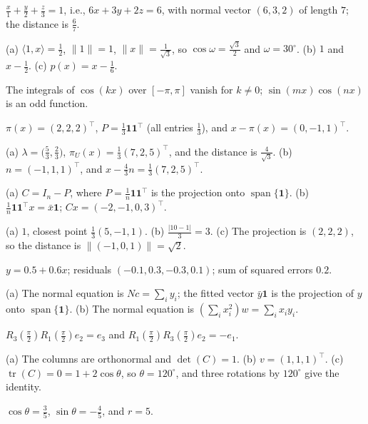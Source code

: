 \documentclass[11pt]{article}
\theoremstyle{definition}
\newcommand{\norm}[1]{\lVert #1 \rVert}
\newcommand{\ip}[2]{\langle #1, #2 \rangle}
\DeclareMathOperator{\Span}{span}
\DeclareMathOperator{\tr}{tr}
\begin{document}
\begin{description}[leftmargin=0pt, itemsep=0.3em]
    \item[\ref{pr:hyperplane-form}.] $\frac{x}{1} + \frac{y}{2} + \frac{z}{3} = 1$, i.e., $6x + 3y + 2z = 6$, with normal vector $(6, 3, 2)$ of length $7$; the distance is $\frac{6}{7}$.
    \item[\ref{pr:func-ip}.] (a) $\ip{1}{x} = \frac{1}{2}$, $\norm{1} = 1$, $\norm{x} = \frac{1}{\sqrt{3}}$, so $\cos\omega = \frac{\sqrt{3}}{2}$ and $\omega = 30^\circ$. (b) $1$ and $x - \frac{1}{2}$. (c) $p(x) = x - \frac{1}{6}$.
    \item[\ref{pr:fourier}.] The integrals of $\cos(kx)$ over $[-\pi, \pi]$ vanish for $k \neq 0$; $\sin(mx)\cos(nx)$ is an odd function.
    \item[\ref{pr:proj-line}.] $\pi(x) = (2, 2, 2)^\top$, $P = \frac{1}{3}\mathbf{1}\mathbf{1}^\top$ (all entries $\frac{1}{3}$), and $x - \pi(x) = (0, -1, 1)^\top$.
    \item[\ref{pr:proj-plane}.] (a) $\lambda = \big(\frac{5}{3}, \frac{2}{3}\big)$, $\pi_U(x) = \frac{1}{3}(7, 2, 5)^\top$, and the distance is $\frac{4}{\sqrt{3}}$. (b) $n = (-1, 1, 1)^\top$, and $x - \frac{4}{3} n = \frac{1}{3}(7, 2, 5)^\top$.
    \item[\ref{pr:centering}.] (a) $C = I_n - P$, where $P = \frac{1}{n}\mathbf{1}\mathbf{1}^\top$ is the projection onto $\Span\{\mathbf{1}\}$. (b) $\frac{1}{n}\mathbf{1}\mathbf{1}^\top x = \bar{x}\mathbf{1}$; $Cx = (-2, -1, 0, 3)^\top$.
    \item[\ref{pr:distances}.] (a) $1$, closest point $\frac{1}{3}(5, -1, 1)$. (b) $\frac{|10 - 1|}{3} = 3$. (c) The projection is $(2, 2, 2)$, so the distance is $\norm{(-1, 0, 1)} = \sqrt{2}$.
    \item[\ref{pr:least-squares}.] $y = 0.5 + 0.6x$; residuals $(-0.1, 0.3, -0.3, 0.1)$; sum of squared errors $0.2$.
    \item[\ref{pr:ls-special}.] (a) The normal equation is $N c = \sum_i y_i$; the fitted vector $\bar{y}\mathbf{1}$ is the projection of $y$ onto $\Span\{\mathbf{1}\}$. (b) The normal equation is $(\sum_i x_i^2) w = \sum_i x_i y_i$.
    \item[\ref{pr:rot-noncomm}.] $R_3(\frac{\pi}{2})R_1(\frac{\pi}{2}) e_2 = e_3$ and $R_1(\frac{\pi}{2})R_3(\frac{\pi}{2}) e_2 = -e_1$.
    \item[\ref{pr:rot-axis}.] (a) The columns are orthonormal and $\det(C) = 1$. (b) $v = (1, 1, 1)^\top$. (c) $\tr(C) = 0 = 1 + 2\cos\theta$, so $\theta = 120^\circ$, and three rotations by $120^\circ$ give the identity.
    \item[\ref{pr:givens}.] $\cos\theta = \frac{3}{5}$, $\sin\theta = -\frac{4}{5}$, and $r = 5$.

\end{description}
\end{document}
